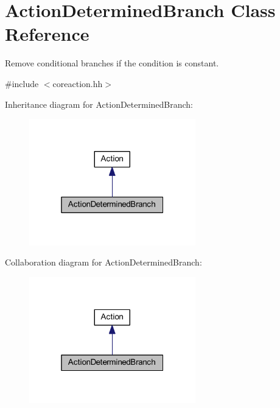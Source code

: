 \hypertarget{class_action_determined_branch}{}\section{Action\+Determined\+Branch Class Reference}
\label{class_action_determined_branch}


Remove conditional branches if the condition is constant.  




{\ttfamily \#include $<$coreaction.\+hh$>$}



Inheritance diagram for Action\+Determined\+Branch\+:
\nopagebreak
\begin{figure}[H]
\begin{center}
\leavevmode
\includegraphics[width=205pt]{class_action_determined_branch__inherit__graph}
\end{center}
\end{figure}


Collaboration diagram for Action\+Determined\+Branch\+:
\nopagebreak
\begin{figure}[H]
\begin{center}
\leavevmode
\includegraphics[width=205pt]{class_action_determined_branch__coll__graph}
\end{center}
\end{figure}
